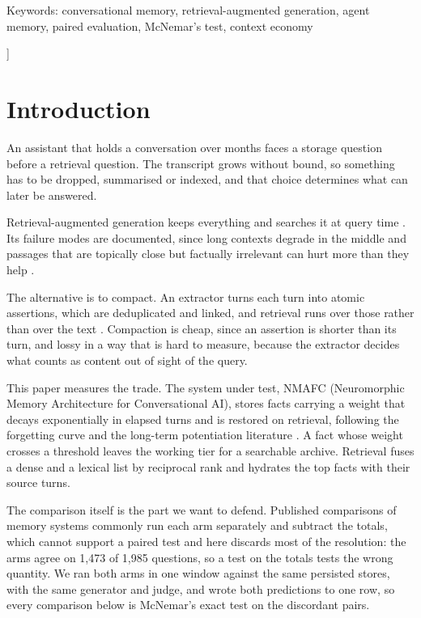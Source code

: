 \documentclass[10pt,a4paper,twocolumn]{article}
\begin{document}
{\begin{center}
\begin{minipage}{0.86\textwidth}
Keywords: conversational memory, retrieval-augmented generation, agent memory, paired evaluation, McNemar's test, context economy
\end{minipage}
\end{center}
\vspace{1.4em}
}]



\section{Introduction}

An assistant that holds a conversation over months faces a storage question before a retrieval question. The transcript grows without bound, so something has to be dropped, summarised or indexed, and that choice determines what can later be answered.

Retrieval-augmented generation keeps everything and searches it at query time \citep{lewis2020,karpukhin2020}. Its failure modes are documented, since long contexts degrade in the middle \citep{liu2024} and passages that are topically close but factually irrelevant can hurt more than they help \citep{cuconasu2024}.

The alternative is to compact. An extractor turns each turn into atomic assertions, which are deduplicated and linked, and retrieval runs over those rather than over the text \citep{packer2023,zhong2024,rasmussen2025,xu2025,chhikara2025}. Compaction is cheap, since an assertion is shorter than its turn, and lossy in a way that is hard to measure, because the extractor decides what counts as content out of sight of the query.

This paper measures the trade. The system under test, NMAFC (Neuromorphic Memory Architecture for Conversational AI), stores facts carrying a weight that decays exponentially in elapsed turns and is restored on retrieval, following the forgetting curve \citep{murre2015} and the long-term potentiation literature \citep{bliss1973}. A fact whose weight crosses a threshold leaves the working tier for a searchable archive. Retrieval fuses a dense and a lexical list by reciprocal rank \citep{cormack2009} and hydrates the top facts with their source turns.

The comparison itself is the part we want to defend. Published comparisons of memory systems commonly run each arm separately and subtract the totals, which cannot support a paired test and here discards most of the resolution: the arms agree on 1,473 of 1,985 questions, so a test on the totals tests the wrong quantity. We ran both arms in one window against the same persisted stores, with the same generator and judge, and wrote both predictions to one row, so every comparison below is McNemar's exact test on the discordant pairs.
\end{document}
